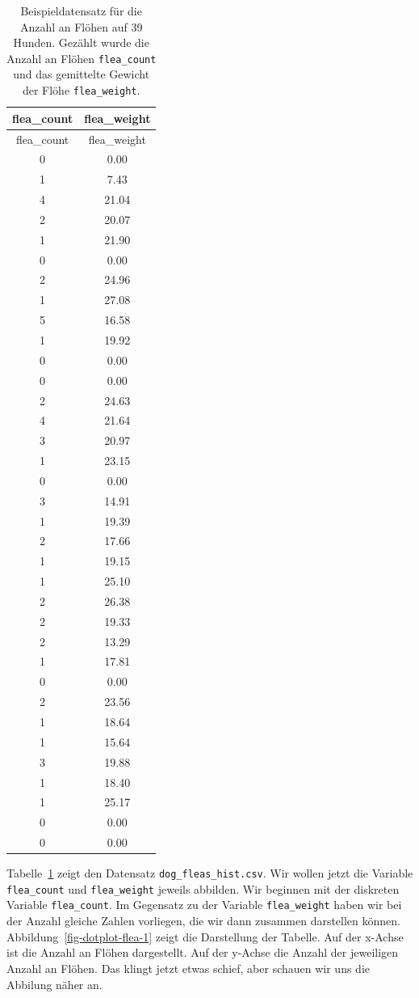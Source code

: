 \documentclass[
  letterpaper,
  DIV=11,
  oneside]{scrreport}
\begin{document}
\hypertarget{tbl-cat-dog-histogram}{}
\begin{longtable}[]{@{}cc@{}}
\caption{\label{tbl-cat-dog-histogram}Beispieldatensatz für die Anzahl
an Flöhen auf 39 Hunden. Gezählt wurde die Anzahl an Flöhen
\texttt{flea\_count} und das gemittelte Gewicht der Flöhe
\texttt{flea\_weight}.}\tabularnewline
\toprule()
flea\_count & flea\_weight \\
\midrule()
\endfirsthead
\toprule()
flea\_count & flea\_weight \\
\midrule()
\endhead
0 & 0.00 \\
1 & 7.43 \\
4 & 21.04 \\
2 & 20.07 \\
1 & 21.90 \\
0 & 0.00 \\
2 & 24.96 \\
1 & 27.08 \\
5 & 16.58 \\
1 & 19.92 \\
0 & 0.00 \\
0 & 0.00 \\
2 & 24.63 \\
4 & 21.64 \\
3 & 20.97 \\
1 & 23.15 \\
0 & 0.00 \\
3 & 14.91 \\
1 & 19.39 \\
2 & 17.66 \\
1 & 19.15 \\
1 & 25.10 \\
2 & 26.38 \\
2 & 19.33 \\
2 & 13.29 \\
1 & 17.81 \\
0 & 0.00 \\
2 & 23.56 \\
1 & 18.64 \\
1 & 15.64 \\
3 & 19.88 \\
1 & 18.40 \\
1 & 25.17 \\
0 & 0.00 \\
0 & 0.00 \\
\bottomrule()
\end{longtable}

Tabelle~\ref{tbl-cat-dog-histogram} zeigt den Datensatz
\texttt{dog\_fleas\_hist.csv}. Wir wollen jetzt die Variable
\texttt{flea\_count} und \texttt{flea\_weight} jeweils abbilden. Wir
beginnen mit der diskreten Variable \texttt{flea\_count}. Im Gegensatz
zu der Variable \texttt{flea\_weight} haben wir bei der Anzahl gleiche
Zahlen vorliegen, die wir dann zusammen darstellen können.
Abbildung~\ref{fig-dotplot-flea-1} zeigt die Darstellung der Tabelle.
Auf der x-Achse ist die Anzahl an Flöhen dargestellt. Auf der y-Achse
die Anzahl der jeweiligen Anzahl an Flöhen. Das klingt jetzt etwas
schief, aber schauen wir uns die Abbilung näher an.
\end{document}
